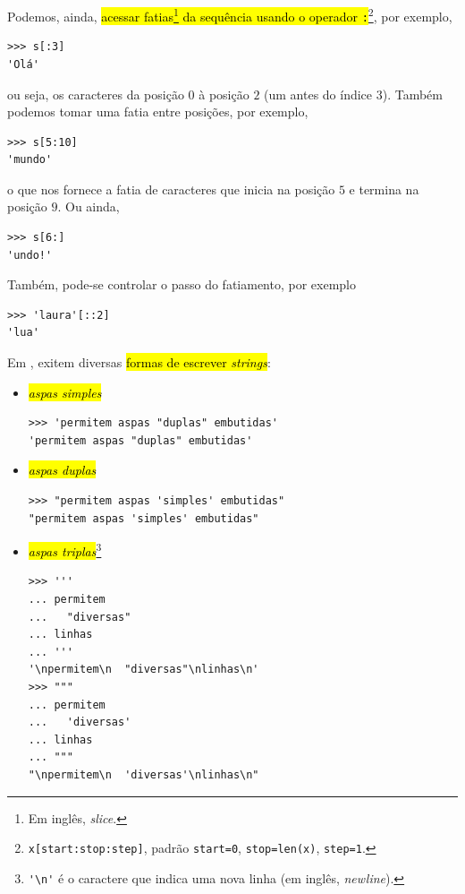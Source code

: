 Podemos, ainda, \hl{acessar fatias\footnote{Em inglês, \textit{slice}.} da sequência usando o operador {\lstinline+:+}}\footnote{\lstinline+x[start:stop:step]+, padrão \lstinline+start=0+, \lstinline+stop=len(x)+, \lstinline+step=1+.}, por exemplo,
\begin{lstlisting}
>>> s[:3]
'Olá'
\end{lstlisting}
ou seja, os caracteres da posição $0$ à posição $2$ (um antes do índice $3$). Também podemos tomar uma fatia entre posições, por exemplo,
\begin{lstlisting}
>>> s[5:10]
'mundo'
\end{lstlisting}
o que nos fornece a fatia de caracteres que inicia na posição $5$ e termina na posição $9$. Ou ainda,
\begin{lstlisting}
>>> s[6:]
'undo!'
\end{lstlisting}
Também, pode-se controlar o passo do fatiamento, por exemplo
\begin{lstlisting}
>>> 'laura'[::2]
'lua'
\end{lstlisting}

Em {\python}, exitem diversas \hl{formas de escrever \textit{strings}}:
\begin{itemize}
\item \hl{\emph{aspas simples}}

\begin{lstlisting}
>>> 'permitem aspas "duplas" embutidas'
'permitem aspas "duplas" embutidas'
\end{lstlisting}

\item \hl{\emph{aspas duplas}}

\begin{lstlisting}
>>> "permitem aspas 'simples' embutidas"
"permitem aspas 'simples' embutidas"
\end{lstlisting}

\item \hl{\emph{aspas triplas}}\footnote{\lstinline+'\n'+ é o caractere que indica uma nova linha (em inglês, \textit{newline}).}

\begin{lstlisting}
>>> '''
... permitem
...   "diversas"
... linhas
... '''
'\npermitem\n  "diversas"\nlinhas\n'
>>> """
... permitem
...   'diversas'
... linhas
... """
"\npermitem\n  'diversas'\nlinhas\n"
\end{lstlisting}
\end{itemize}

